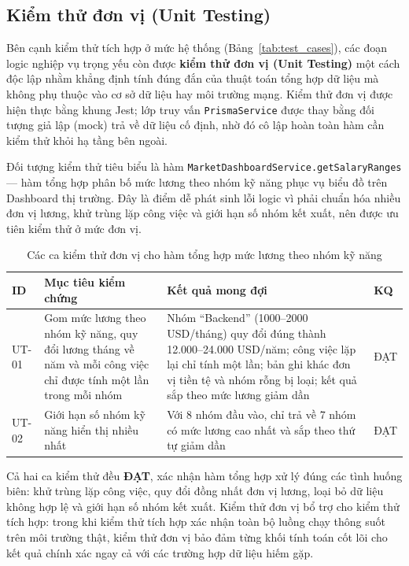 \subsection{Kiểm thử đơn vị (Unit Testing)}
\label{subsec:unit_test}

Bên cạnh kiểm thử tích hợp ở mức hệ thống (Bảng~\ref{tab:test_cases}), các đoạn logic nghiệp vụ trọng yếu còn được \textbf{kiểm thử đơn vị (Unit Testing)} một cách độc lập nhằm khẳng định tính đúng đắn của thuật toán tổng hợp dữ liệu mà không phụ thuộc vào cơ sở dữ liệu hay môi trường mạng. Kiểm thử đơn vị được hiện thực bằng khung Jest; lớp truy vấn \texttt{PrismaService} được thay bằng đối tượng giả lập (mock) trả về dữ liệu cố định, nhờ đó cô lập hoàn toàn hàm cần kiểm thử khỏi hạ tầng bên ngoài.

Đối tượng kiểm thử tiêu biểu là hàm \texttt{MarketDashboardService.\allowbreak getSalaryRanges} --- hàm tổng hợp phân bố mức lương theo nhóm kỹ năng phục vụ biểu đồ trên Dashboard thị trường. Đây là điểm dễ phát sinh lỗi logic vì phải chuẩn hóa nhiều đơn vị lương, khử trùng lặp công việc và giới hạn số nhóm kết xuất, nên được ưu tiên kiểm thử ở mức đơn vị.

\begin{table}[H]
\caption{Các ca kiểm thử đơn vị cho hàm tổng hợp mức lương theo nhóm kỹ năng}
\label{tab:unit_tests}
\begin{center}
\begin{tabular}{|C{1.1cm}|L{5.3cm}|L{5.3cm}|C{1.0cm}|}
\hline
\textbf{ID} & \textbf{Mục tiêu kiểm chứng} & \textbf{Kết quả mong đợi} & \textbf{KQ} \\
\hline
UT-01 & Gom mức lương theo nhóm kỹ năng, quy đổi lương tháng về năm và mỗi công việc chỉ được tính một lần trong mỗi nhóm & Nhóm ``Backend'' (1000--2000 USD/tháng) quy đổi đúng thành 12.000--24.000 USD/năm; công việc lặp lại chỉ tính một lần; bản ghi khác đơn vị tiền tệ và nhóm rỗng bị loại; kết quả sắp theo mức lương giảm dần & ĐẠT \\
\hline
UT-02 & Giới hạn số nhóm kỹ năng hiển thị nhiều nhất & Với 8 nhóm đầu vào, chỉ trả về 7 nhóm có mức lương cao nhất và sắp theo thứ tự giảm dần & ĐẠT \\
\hline
\end{tabular}
\end{center}
\end{table}

Cả hai ca kiểm thử đều \textbf{ĐẠT}, xác nhận hàm tổng hợp xử lý đúng các tình huống biên: khử trùng lặp công việc, quy đổi đồng nhất đơn vị lương, loại bỏ dữ liệu không hợp lệ và giới hạn số nhóm kết xuất. Kiểm thử đơn vị bổ trợ cho kiểm thử tích hợp: trong khi kiểm thử tích hợp xác nhận toàn bộ luồng chạy thông suốt trên môi trường thật, kiểm thử đơn vị bảo đảm từng khối tính toán cốt lõi cho kết quả chính xác ngay cả với các trường hợp dữ liệu hiếm gặp.

